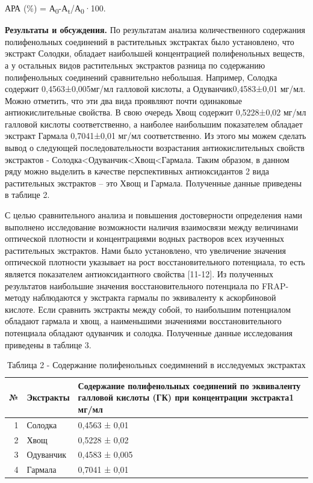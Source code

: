 \begin{multicols}{2}
АРА (\%) = А\textsubscript{0}-А\textsubscript{t}/А\textsubscript{0}·100.

{\bfseries Результаты и обсуждения.} По результатам анализа количественного
содержания полифенольных соединений в растительных экстрактах было
установлено, что экстракт Солодки, обладает наибольшей концентрацией
полифенольных веществ, а у остальных видов растительных экстрактов
разница по содержанию полифенольных соединений сравнительно небольшая.
Например, Солодка содержит 0,4563±0,005мг/мл галловой кислоты, а
Одуванчик0,4583±0,01 мг/мл. Можно отметить, что эти два вида проявляют
почти одинаковые антиокислительные свойства. В свою очередь Хвощ
содержит 0,5228±0,02 мг/мл галловой кислоты соответственно, а наиболее
наибольшим показателем обладает экстракт Гармала 0,7041±0,01 мг/мл
соответственно. Из этого мы можем сделать вывод о следующей
последовательности возрастания антиокислительных свойств экстрактов -
Солодка\textless Одуванчик\textless Хвощ\textless Гармала. Таким
образом, в данном ряду можно выделить в качестве перспективных
антиоксидантов 2 вида растительных экстрактов -- это Хвощ и Гармала.
Полученные данные приведены в таблице 2.

С целью сравнительного анализа и повышения достоверности определения
нами выполнено исследование возможности наличия взаимосвязи между
величинами оптической плотности и концентрациями водных растворов всех
изученных растительных экстрактов. Нами было установлено, что увеличение
значения оптической плотности указывает на рост восстановительного
потенциала, то есть является показателем антиоксидантного свойства
{[}11-12{]}. Из полученных результатов наибольшие значения
восстановительного потенциала по FRAP-методу наблюдаются у экстракта
гармалы по эквиваленту к аскорбиновой кислоте. Если сравнить экстракты
между собой, то наибольшим потенциалом обладают гармала и хвощ, а
наименьшими значениями восстановительного потенциала обладают одуванчик
и солодка. Полученные данные исследования приведены в таблице 3.
\end{multicols}

\begin{table}[H]
\caption*{Таблица 2 - Содержание полифенольных соедимнений в исследуемых экстрактах}
\centering
\begin{tabular}{|r|l|p{}|}
\hline
\multicolumn{1}{|l|}{№} & Экстракты & Содержание полифенольных соединений по эквиваленту галловой кислоты (ГК) при концентрации экстракта1 мг/мл \\ \hline
1 & Солодка   & 0,4563 ± 0,01  \\ \hline
2 & Хвощ      & 0,5228 ± 0,02  \\ \hline
3 & Одуванчик & 0,4583 ± 0,005 \\ \hline
4 & Гармала   & 0,7041 ± 0,01  \\ \hline
\end{tabular}%
\end{table}

